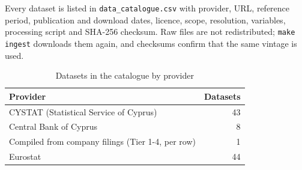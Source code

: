 Every dataset is listed in \texttt{data\_catalogue.csv} with provider, URL, reference period, publication and download dates, licence, scope, resolution, variables, processing script and SHA-256 checksum. Raw files are not redistributed; \texttt{make ingest} downloads them again, and checksums confirm that the same vintage is used.

\begin{table}[h]
\centering
\small
\caption{Datasets in the catalogue by provider}
\label{tab:catalogue}
\begin{tabular}{lr}
\toprule
Provider & Datasets \\
\midrule
CYSTAT (Statistical Service of Cyprus) & 43 \\
Central Bank of Cyprus & 8 \\
Compiled from company filings (Tier 1-4, per row) & 1 \\
Eurostat & 44 \\
\bottomrule
\end{tabular}
\end{table}
